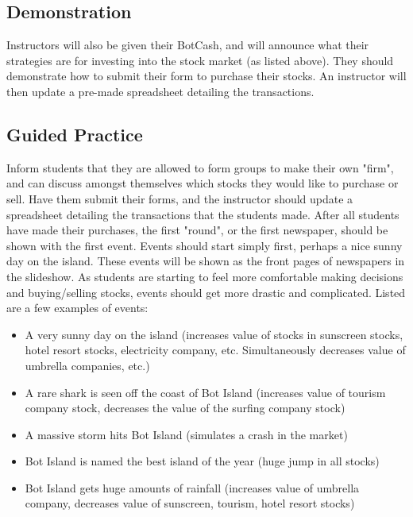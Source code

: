 \documentclass{lessonplan}
\begin{document}
    \subsection{Demonstration}
     Instructors will also be given their BotCash, and will announce what their strategies are for investing into the stock
     market (as listed above). They should demonstrate how to submit their form to purchase their stocks.
     An instructor will then update a pre-made spreadsheet detailing the transactions.
    \subsection{Guided Practice}
      Inform students that they are allowed to form groups to make their own "firm", and can discuss amongst themselves
      which stocks they would like to purchase or sell. Have them submit their forms, and the instructor should update
      a spreadsheet detailing the transactions that the students made. After all students have made their purchases,
      the first "round", or the first newspaper, should be shown with the first event. Events should start simply first,
      perhaps a nice sunny day on the island. These events will be shown as the front pages of newspapers in the
      slideshow. As students are starting to feel more comfortable making decisions and buying/selling stocks, events 
     should get more drastic and complicated. Listed are a few examples of events:
       \begin{itemize} 
          \item A very sunny day on the island (increases value of stocks in sunscreen stocks, hotel resort stocks, electricity
                   company, etc. Simultaneously decreases value of umbrella companies, etc.)
          \item A rare shark is seen off the coast of Bot Island 
                   (increases value of tourism company stock, decreases the value of the surfing company stock)
          \item A massive storm hits Bot Island (simulates a crash in the market)
          \item Bot Island is named the best island of the year (huge jump in all stocks)
          \item Bot Island gets huge amounts of rainfall (increases value of umbrella company,
                   decreases value of sunscreen, tourism, hotel resort stocks)
      \end{itemize}
\end{document}
